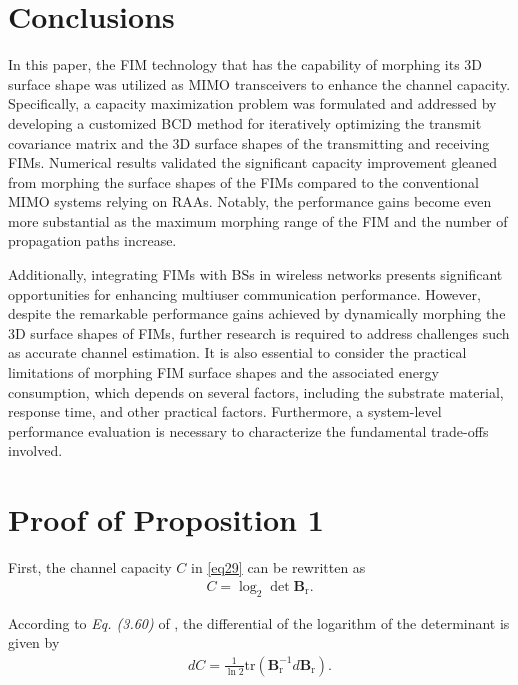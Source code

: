 \documentclass[lettersize,journal]{IEEEtran}
\begin{document}
\section{Conclusions}\label{sec5}
In this paper, the FIM technology that has the capability of morphing its 3D surface shape was utilized as MIMO transceivers to enhance the channel capacity. Specifically, a capacity maximization problem was formulated and addressed by developing a customized BCD method for iteratively optimizing the transmit covariance matrix and the 3D surface shapes of the transmitting and receiving FIMs. Numerical results validated the significant capacity improvement gleaned from morphing the surface shapes of the FIMs compared to the conventional MIMO systems relying on RAAs. Notably, the performance gains become even more substantial as the maximum morphing range of the FIM and the number of propagation paths increase.

Additionally, integrating FIMs with BSs in wireless networks presents significant opportunities for enhancing multiuser communication performance. However, despite the remarkable performance gains achieved by dynamically morphing the 3D surface shapes of FIMs, further research is required to address challenges such as accurate channel estimation. It is also essential to consider the practical limitations of morphing FIM surface shapes and the associated energy consumption, which depends on several factors, including the substrate material, response time, and other practical factors. Furthermore, a system-level performance evaluation is necessary to characterize the fundamental trade-offs involved.


\appendices
\section{Proof of Proposition 1}\label{A1}
First, the channel capacity $C$ in \eqref{eq29} can be rewritten as
\begin{align}
 C = \log_{2}\det \mathbf{B}_{\textrm{r}}.
\end{align}


According to \emph{Eq. (3.60)} of \cite{TSP_2007_Hjorungnesa_Complex}, the differential of the logarithm of the determinant is given by
\begin{align}\label{eq52}
d C = \frac{1}{\ln 2}\textrm{tr}\left ( \mathbf{B}_{\textrm{r}}^{-1}d\mathbf{B}_{\textrm{r}} \right ).
\end{align}
\end{document}
